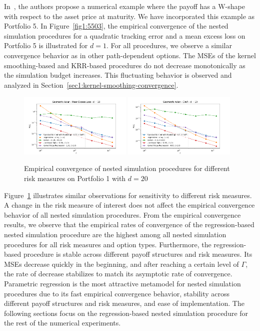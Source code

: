 In~\cite{broadie2015risk}, the authors propose a numerical example where the payoff has a W-shape with respect to the asset price at maturity.
We have incorporated this example as Portfolio 5.
In Figure~\ref{fig1:5503}, the empirical convergence of the nested simulation procedures for a quadratic tracking error and a mean excess loss on Portfolio 5 is illustrated for $d = 1$.
For all procedures, we observe a similar convergence behavior as in other path-dependent options.
The MSEs of the kernel smoothing-based and KRR-based procedures do not decrease monotonically as the simulation budget increases.
This fluctuating behavior is observed and analyzed in Section~\ref{sec1:kernel-smoothing-convergence}.

\begin{figure}[ht!] 
    \centering
    \includegraphics[width=0.48\textwidth]{./project1/figures/figure8a.png}
    \includegraphics[width=0.48\textwidth]{./project1/figures/figure8b.png}
    \caption{Empirical convergence of nested simulation procedures for different risk measures on Portfolio 1 with $d=20$}
    \label{fig1:110x}
\end{figure}

Figure~\ref{fig1:110x} illustrates similar observations for sensitivity to different risk measures.
A change in the risk measure of interest does not affect the empirical convergence behavior of all nested simulation procedures.
From the empirical convergence results, we observe that the empirical rates of convergence of the regression-based nested simulation procedure are the highest among all nested simulation procedures for all risk measures and option types.
Furthermore, the regression-based procedure is stable across different payoff structures and risk measures. 
Its MSEs decrease quickly in the beginning, and after reaching a certain level of $\Gamma$, the rate of decrease stabilizes to match its asymptotic rate of convergence.
Parametric regression is the most attractive metamodel for nested simulation procedures due to its fast empirical convergence behavior, stability across different payoff structures and risk measures, and ease of implementation.
The following sections focus on the regression-based nested simulation procedure for the rest of the numerical experiments.

